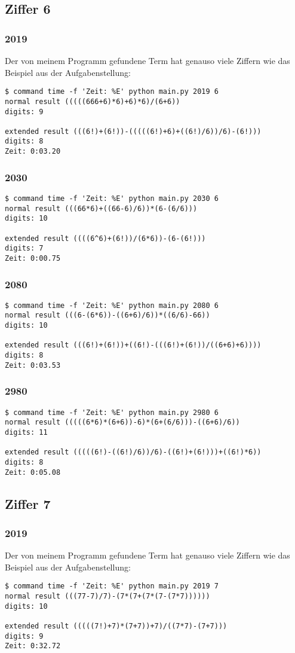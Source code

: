 \subsection{Ziffer 6}
\subsubsection{2019}
Der von meinem Programm gefundene Term hat genauso viele Ziffern wie das Beispiel aus der Aufgabenstellung:
\begin{lstlisting}
$ command time -f 'Zeit: %E' python main.py 2019 6
normal result (((((666+6)*6)+6)*6)/(6+6))
digits: 9

extended result (((6!)+(6!))-(((((6!)+6)+((6!)/6))/6)-(6!)))
digits: 8
Zeit: 0:03.20
\end{lstlisting}
\subsubsection{2030}
\begin{lstlisting}
$ command time -f 'Zeit: %E' python main.py 2030 6
normal result (((66*6)+((66-6)/6))*(6-(6/6)))
digits: 10

extended result ((((6^6)+(6!))/(6*6))-(6-(6!)))
digits: 7
Zeit: 0:00.75
\end{lstlisting}
\subsubsection{2080}
\begin{lstlisting}
$ command time -f 'Zeit: %E' python main.py 2080 6
normal result (((6-(6*6))-((6+6)/6))*((6/6)-66))
digits: 10

extended result (((6!)+(6!))+((6!)-(((6!)+(6!))/((6+6)+6))))
digits: 8
Zeit: 0:03.53
\end{lstlisting}
\subsubsection{2980}
\begin{lstlisting}
$ command time -f 'Zeit: %E' python main.py 2980 6
normal result (((((6*6)*(6+6))-6)*(6+(6/6)))-((6+6)/6))
digits: 11

extended result (((((6!)-((6!)/6))/6)-((6!)+(6!)))+((6!)*6))
digits: 8
Zeit: 0:05.08
\end{lstlisting}
\subsection{Ziffer 7}
\subsubsection{2019}
Der von meinem Programm gefundene Term hat genauso viele Ziffern wie das Beispiel aus der Aufgabenstellung:
\begin{lstlisting}
$ command time -f 'Zeit: %E' python main.py 2019 7
normal result (((77-7)/7)-(7*(7+(7*(7-(7*7))))))
digits: 10

extended result (((((7!)+7)*(7+7))+7)/((7*7)-(7+7)))
digits: 9
Zeit: 0:32.72
\end{lstlisting}
